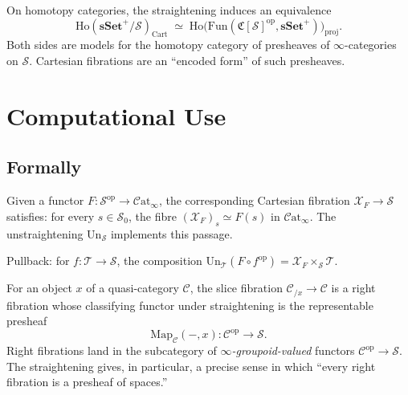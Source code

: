 \begin{theorem}
\label{thm:equiv-presheaves}
On homotopy categories, the straightening induces an equivalence
\begin{equation*}
  \mathrm{Ho}(\mathbf{sSet}^+\!/\mathcal{S})_{\mathrm{Cart}} \;\simeq\;
  \mathrm{Ho}\bigl(\mathrm{Fun}(\mathfrak{C}[\mathcal{S}]^{\mathrm{op}}, \mathbf{sSet}^+)\bigr)_{\mathrm{proj}}.
\end{equation*}
Both sides are models for the homotopy category of presheaves of
$\infty$-categories on $\mathcal{S}$. Cartesian fibrations are an
``encoded form'' of such presheaves.
\end{theorem}


\section{Computational Use}
\label{sec:straightening-computational}

\subsection{Formally}

\begin{example_thm}
\label{ex:pullback-classifying}
Given a functor $F : \mathcal{S}^{\mathrm{op}} \to \mathcal{C}\mathrm{at}_\infty$,
the corresponding Cartesian fibration $\mathcal{X}_F \to \mathcal{S}$
satisfies: for every $s \in \mathcal{S}_0$, the fibre $(\mathcal{X}_F)_s
\simeq F(s)$ in $\mathcal{C}\mathrm{at}_\infty$. The unstraightening
$\mathrm{Un}_\mathcal{S}$ implements this passage.

Pullback: for $f : \mathcal{T} \to \mathcal{S}$, the composition
$\mathrm{Un}_\mathcal{T}(F \circ f^{\mathrm{op}}) = \mathcal{X}_F \times_\mathcal{S}
\mathcal{T}$.
\end{example_thm}

\begin{example_thm}
\label{ex:representable-slice}
For an object $x$ of a quasi-category $\mathcal{C}$, the slice fibration
$\mathcal{C}_{/x} \to \mathcal{C}$ is a right fibration whose classifying
functor under straightening is the representable presheaf
\begin{equation*}
  \mathrm{Map}_\mathcal{C}(-, x) : \mathcal{C}^{\mathrm{op}} \to \mathcal{S}.
\end{equation*}
Right fibrations land in the subcategory of \emph{$\infty$-groupoid-valued}
functors $\mathcal{C}^{\mathrm{op}} \to \mathcal{S}$. The straightening
gives, in particular, a precise sense in which ``every right fibration
is a presheaf of spaces.''
\end{example_thm}

